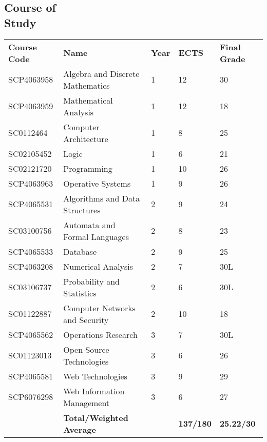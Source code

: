 \documentclass[margin, 10pt]{res}
\begin{document}
\begin{resume}
\section{Course of \\ Study}
\begin{longtable}{lllll}
\textbf{Course Code} & \textbf{Name}                   & \textbf{Year} & \textbf{ECTS}     & \textbf{Final Grade} \\
SCP4063958            & Algebra and Discrete Mathematics   & 1             & 12               & 30                   \\
SCP4063959            & Mathematical Analysis              & 1             & 12               & 18                   \\
SC0112464             & Computer Architecture  & 1             & 8                & 25                   \\
SC02105452            & Logic                          & 1             & 6                & 21                   \\
SC02121720            & Programming                  & 1             & 10               & 26                   \\
SCP4063963            & Operative Systems               & 1             & 9                & 26                   \\
SCP4065531            & Algorithms and Data Structures      & 2             & 9                & 24                   \\
SC03100756            & Automata and Formal Languages      & 2             & 8                & 23                   \\
SCP4065533            & Database                    & 2             & 9                & 25                   \\
SCP4063208            & Numerical Analysis                & 2             & 7                & 30L                  \\
SC03106737            & Probability and Statistics        & 2             & 6                & 30L                  \\
SC01122887            & Computer Networks and Security                & 2             & 10               & 18                   \\
SCP4065562            & Operations Research               & 3             & 7                & 30L                  \\
SC01123013            & Open-Source Technologies           & 3             & 6                & 26                   \\
SCP4065581            & Web Technologies                  & 3             & 9                & 29                   \\
SCP6076298            & Web Information Management      & 3             & 6                & 27                   \\
\textbf{}             & \textbf{Total/Weighted Average} & \textbf{}     & \textbf{137/180} & \textbf{25.22/30}   
\end{longtable}


\end{resume}
\end{document}

